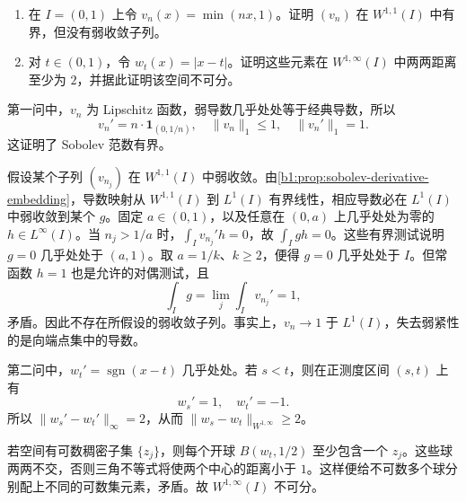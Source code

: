 \begin{optionalexercise}\label{b1:ex:21-endpoint-structure}
\begin{enumerate}
\item\label{b1:item:21-w11-no-weak-subsequence}
在 \(I=(0,1)\) 上令 \(v_n(x)=\min(nx,1)\)。证明 \((v_n)\) 在 \(W^{1,1}(I)\) 中有界，但没有弱收敛子列。
\item\label{b1:item:21-w1infty-nonseparable}
对 \(t\in(0,1)\)，令 \(w_t(x)=|x-t|\)。证明这些元素在 \(W^{1,\infty}(I)\) 中两两距离至少为 \(2\)，并据此证明该空间不可分。
\end{enumerate}
\end{optionalexercise}
\begin{solution}
第一问中，\(v_n\) 为 Lipschitz 函数，弱导数几乎处处等于经典导数，所以
\[
 v_n'=n\cdot\mathbf1_{(0,1/n)},\quad
 \|v_n\|_1\le1,\quad \|v_n'\|_1=1.
\]
这证明了 Sobolev 范数有界。

假设某个子列 \((v_{n_j})\) 在 \(W^{1,1}(I)\) 中弱收敛。由\cref{b1:prop:sobolev-derivative-embedding}，导数映射从 \(W^{1,1}(I)\) 到 \(L^1(I)\) 有界线性，相应导数必在 \(L^1(I)\) 中弱收敛到某个 \(g\)。固定 \(a\in(0,1)\)，以及任意在 \((0,a)\) 上几乎处处为零的 \(h\in L^\infty(I)\)。当 \(n_j>1/a\) 时，\(\int_Iv_{n_j}'h=0\)，故 \(\int_Igh=0\)。这些有界测试说明 \(g=0\) 几乎处处于 \((a,1)\)。取 \(a=1/k\)、\(k\ge2\)，便得 \(g=0\) 几乎处处于 \(I\)。但常函数 \(h=1\) 也是允许的对偶测试，且
\[
 \int_Ig=\lim_j\int_Iv_{n_j}'=1,
\]
矛盾。因此不存在所假设的弱收敛子列。事实上，\(v_n\to1\) 于 \(L^1(I)\)，失去弱紧性的是向端点集中的导数。

第二问中，\(w_t'=\operatorname{sgn}(x-t)\) 几乎处处。若 \(s<t\)，则在正测度区间 \((s,t)\) 上有
\[
 w_s'=1,\quad w_t'=-1.
\]
所以 \(\|w_s'-w_t'\|_\infty=2\)，从而 \(\|w_s-w_t\|_{W^{1,\infty}}\ge2\)。

若空间有可数稠密子集 \(\{z_j\}\)，则每个开球 \(B(w_t,1/2)\) 至少包含一个 \(z_j\)。这些球两两不交，否则三角不等式将使两个中心的距离小于 \(1\)。这样便给不可数多个球分别配上不同的可数集元素，矛盾。故 \(W^{1,\infty}(I)\) 不可分。
\end{solution}

